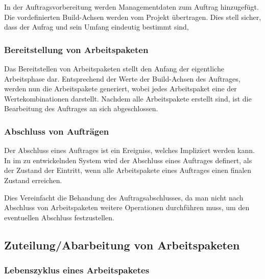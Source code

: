 In der Auftragsvorbereitung werden Managementdaten zum Auftrag hinzugef\"ugt.
Die vordefinierten Build-Achsen werden vom Projekt \"ubertragen.
Dies stell sicher, dass der Aufrag und sein Umfang eindeutig bestimmt sind,


\subsubsection{Bereitstellung von Arbeitspaketen}

Das Bereitstellen von Arbeitspaketen stellt den Anfang der eigentliche Arbeitsphase dar.
Entsprechend der Werte der Build-Achsen des Auftrages, werden nun die Arbeitspakete generiert,
wobei jedes Arbeitspaket eine der Wertekombinationen darstellt.
Nachdem alle Arbeitspakete erstellt sind, ist die Bearbeitung des Auftrages an sich abgeschlossen.

\subsubsection{Abschluss von Auftr\"agen}

Der Abschluss eines Auftrages ist ein Ereigniss, welches Impliziert werden kann.
In im zu entwickelnden System wird der Abschluss eines Auftrages definert,
als der Zustand der Eintritt, wenn alle Arbeitspakete eines Auftrages
einen finalen Zustand erreichen.

Dies Vereinfacht die Behandung des Auftragsabschlusses,
da man nicht nach Abschluss von Arbeitspaketen weitere Operationen durchf\"uhren muss,
um den eventuellen Abschluss festzustellen.

\subsection{Zuteilung/Abarbeitung von Arbeitspaketen}


\subsubsection{Lebenszyklus eines Arbeitspaketes}


